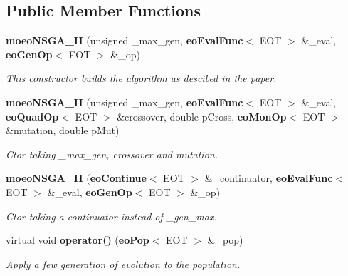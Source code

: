 \subsection*{Public Member Functions}
\begin{CompactItemize}
\item 
{\bf moeo\-NSGA\_\-II} (unsigned \_\-max\_\-gen, {\bf eo\-Eval\-Func}$<$ EOT $>$ \&\_\-eval, {\bf eo\-Gen\-Op}$<$ EOT $>$ \&\_\-op)
\begin{CompactList}\small\item\em This constructor builds the algorithm as descibed in the paper. \item\end{CompactList}\item 
{\bf moeo\-NSGA\_\-II} (unsigned \_\-max\_\-gen, {\bf eo\-Eval\-Func}$<$ EOT $>$ \&\_\-eval, {\bf eo\-Quad\-Op}$<$ EOT $>$ \&crossover, double p\-Cross, {\bf eo\-Mon\-Op}$<$ EOT $>$ \&mutation, double p\-Mut)\label{classmoeoNSGA__II_37109beabe74b0fecb2f3f899ef573d7}

\begin{CompactList}\small\item\em Ctor taking \_\-max\_\-gen, crossover and mutation. \item\end{CompactList}\item 
{\bf moeo\-NSGA\_\-II} ({\bf eo\-Continue}$<$ EOT $>$ \&\_\-continuator, {\bf eo\-Eval\-Func}$<$ EOT $>$ \&\_\-eval, {\bf eo\-Gen\-Op}$<$ EOT $>$ \&\_\-op)\label{classmoeoNSGA__II_29ae86b4254ba6e5263c159df812fb7e}

\begin{CompactList}\small\item\em Ctor taking a continuator instead of \_\-gen\_\-max. \item\end{CompactList}\item 
virtual void {\bf operator()} ({\bf eo\-Pop}$<$ EOT $>$ \&\_\-pop)\label{classmoeoNSGA__II_a9a94b2ee67038b81cdba0fd005350d0}

\begin{CompactList}\small\item\em Apply a few generation of evolution to the population. \item\end{CompactList}\end{CompactItemize}
